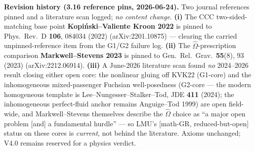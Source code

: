 \documentclass[11pt]{article}
\begin{document}
\smallskip\noindent\textbf{Revision history (3.16 reference pins, 2026-06-24).} Two journal references pinned and a literature scan logged; \emph{no content change}. \textbf{(i)} The CCC two-sided-matching base point \textbf{Kopi\'nski--Valiente Kroon 2022} is pinned to Phys.\ Rev.\ D \textbf{106}, 084034 (2022) (arXiv:2201.10875) --- clearing the carried unpinned-reference item from the G1/G2 failure log. \textbf{(ii)} The $\hat\Omega$-prescription comparison \textbf{Markwell--Stevens 2023} is pinned to Gen.\ Rel.\ Grav.\ \textbf{55}(8), 93 (2023) (arXiv:2212.06914). \textbf{(iii)} A June-2026 literature scan found \emph{no} 2024--2026 result closing either open core: the nonlinear gluing off KVK22 (G1-core) and the inhomogeneous mixed-passenger Fuchsian well-posedness (G2-core --- the modern homogeneous template is Lee--Nungesser--Stalker--Tod, JDE \textbf{411} (2024); the inhomogeneous perfect-fluid anchor remains Anguige--Tod 1999) are open field-wide, and Markwell--Stevens themselves describe the $\hat\Omega$ choice as ``a major open problem [and] a fundamental hurdle'' --- so LMU's [math-GR, reduced-but-open] status on these cores is \emph{current}, not behind the literature. Axioms unchanged; V4.0 remains reserved for a physics verdict.
\end{document}
